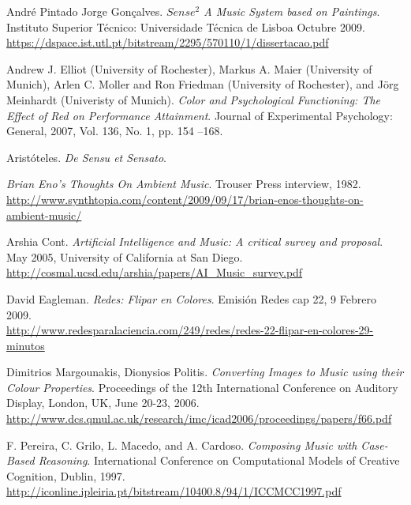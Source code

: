 \begin{thebibliography}{9}

  André Pintado Jorge Gonçalves. \emph{$Sense^{2}$ A Music System based on Paintings}. Instituto Superior Técnico: Universidade Técnica de Lisboa Octubre 2009.\\
 \url{https://dspace.ist.utl.pt/bitstream/2295/570110/1/dissertacao.pdf}
 
  Andrew J. Elliot (University of Rochester), Markus A. Maier (University of Munich), Arlen C. Moller and Ron Friedman (University of Rochester), and Jörg Meinhardt (Univeristy of Munich). \emph{Color and Psychological Functioning: The Effect of Red on Performance Attainment}. Journal of Experimental Psychology: General, 2007, Vol. 136, No. 1, pp. 154 –168.

 Aristóteles. \emph{De Sensu et Sensato}.

 \emph{Brian Eno's Thoughts On Ambient Music}. Trouser Press interview, 1982. \\
 \url{http://www.synthtopia.com/content/2009/09/17/brian-enos-thoughts-on-ambient-music/}

 Arshia Cont. \emph{Artificial Intelligence and Music: A critical survey and proposal}. May 2005, University of California at San Diego.\\
 \url{http://cosmal.ucsd.edu/arshia/papers/AI_Music_survey.pdf}

 David Eagleman. \emph{Redes: Flipar en Colores}. Emisión Redes cap 22, 9 Febrero 2009.\\
 \url{http://www.redesparalaciencia.com/249/redes/redes-22-flipar-en-colores-29-minutos}

 Dimitrios Margounakis, Dionysios Politis. \emph{Converting Images to Music using their Colour Properties}. Proceedings of the 12th International Conference on Auditory Display, London, UK, June 20-23, 2006.\\
 \url{http://www.dcs.qmul.ac.uk/research/imc/icad2006/proceedings/papers/f66.pdf}

 F. Pereira, C. Grilo, L. Macedo, and A. Cardoso. \emph{Composing Music with Case-Based Reasoning}. International Conference on Computational Models of Creative Cognition, Dublin, 1997.\\
 \url{http://iconline.ipleiria.pt/bitstream/10400.8/94/1/ICCMCC1997.pdf}


\end{thebibliography}
